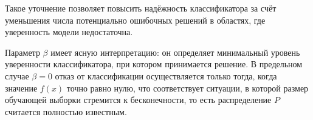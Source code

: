 
Такое уточнение позволяет повысить надёжность классификатора за счёт уменьшения числа потенциально ошибочных решений в областях, где уверенность модели недостаточна.

Параметр \(\beta\) имеет ясную интерпретацию: он определяет минимальный уровень уверенности классификатора, при котором принимается решение. В предельном случае \(\beta = 0\) отказ от классификации осуществляется только тогда, когда значение \(f(x)\) точно равно нулю, что соответствует ситуации, в которой размер обучающей выборки стремится к бесконечности, то есть распределение \(P\) считается полностью известным.
